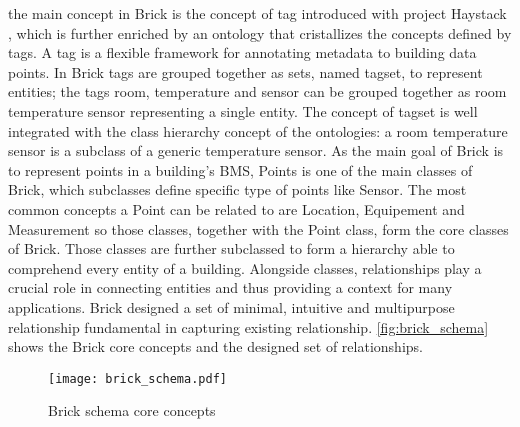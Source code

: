 the main concept in Brick is the concept of tag introduced with project Haystack \cite{project_haystack}, which is further enriched by an ontology that cristallizes the concepts defined by tags. A tag is a flexible framework for annotating metadata to building data points. In Brick tags are grouped together as sets, named tagset, to represent entities; the tags {room}, {temperature} and {sensor} can be grouped together as {room temperature sensor} representing a single entity. The concept of tagset is well integrated with the class hierarchy concept of the ontologies: a {room temperature sensor} is a subclass of a generic {temperature sensor}.
As the main goal of Brick is to represent points in a building's BMS, Points is one of the main classes of Brick, which subclasses define specific type of points like Sensor. The most common concepts a Point can be related to are Location, Equipement and Measurement so those classes, together with the Point class, form the core classes of Brick. Those classes are further subclassed to form a hierarchy able to comprehend every entity of a building. Alongside classes, relationships play a crucial role in connecting entities and thus providing a context for many applications. Brick designed a set of minimal, intuitive and multipurpose relationship fundamental in capturing existing relationship. \autoref{fig:brick_schema} shows the Brick core concepts and the designed set of relationships.

\begin{figure}
  \centering
  \texttt{[image: brick\_schema.pdf]}
  \caption{Brick schema core concepts}
  \label{fig:brick_schema}
\end{figure}

